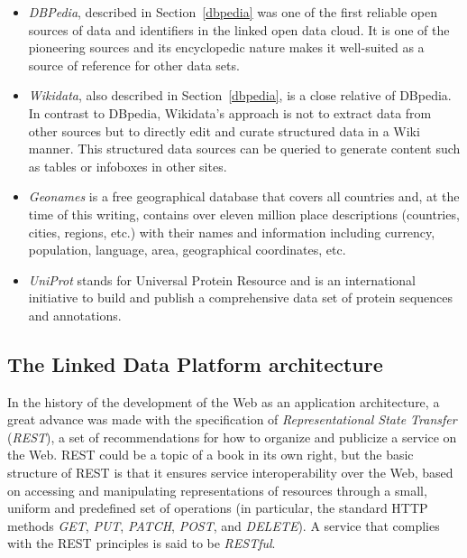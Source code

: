 \begin{itemize}
\item
  \emph{DBPedia}, described in Section~\ref{dbpedia} was one of the first reliable open sources
  of data and identifiers in
  the linked open data cloud. It is one of the pioneering sources and
  its encyclopedic nature makes it well-suited as a source of reference
  for other data sets.

\item
  \emph{Wikidata}, also described in Section~\ref{dbpedia}, is a close relative of DBpedia.  In contrast to
  DBpedia, Wikidata's approach is not to extract data
  from other sources but to directly edit and curate structured data in
  a Wiki manner.  This structured data sources can be queried to
  generate content such as tables or infoboxes in other sites. 

\item
  \emph{Geonames} is a free geographical database that covers all countries
  and, at the time of this writing, contains over eleven million place
  descriptions (countries, cities, regions, etc.) with their names and
  information including currency, population, language, area,
  geographical coordinates, etc.

\item
  \emph{UniProt} stands for Universal Protein Resource and is an international
  initiative to build and publish a comprehensive data set of protein
  sequences and annotations.
\end{itemize}



\hypertarget{the-linked-data-platform-architecture}{%
\subsection{The Linked Data Platform
architecture}\label{the-linked-data-platform-architecture}}

In the history of the development of the Web as an application architecture,
a great advance was made with the specification of 
\emph{Representational State Transfer} (\emph{REST}), a set of recommendations 
for how to organize and publicize a service on the Web.  
REST could be a topic of a book in its own right, but the basic 
structure of REST is that it ensures service
interoperability over the Web, based on accessing and manipulating
representations of resources through a small, uniform and predefined set of
operations (in particular, the standard HTTP methods \emph{GET},
\emph{PUT}, \emph{PATCH}, \emph{POST}, and \emph{DELETE}). A service
that complies with the REST principles is said to be \emph{RESTful}.

